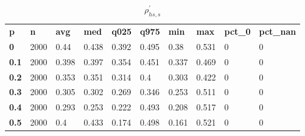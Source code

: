 \begin{table}[h]
 \centering 
\footnotesize
\caption{$\rho_{hs,s}^\prime $}
\label{tab:alphahss}
\begin{tabular}[h]{| l l l l l l l l l l|
    } \hline
\textbf{ p} & \textbf{ n} & \textbf{ avg} & \textbf{ med} & \textbf{ q025} & \textbf{ q975} & \textbf{ min} & \textbf{ max} & \textbf{ pct\_0} & \textbf{ pct\_nan}
           \\
  \textbf{  0} & 2000 &  0.44 & 0.438 & 0.392 & 0.495 &  0.38 & 0.531 & 0 & 0
           \\
  \textbf{0.1} & 2000 & 0.398 & 0.397 & 0.354 & 0.451 & 0.337 & 0.469 & 0 & 0
           \\
  \textbf{0.2} & 2000 & 0.353 & 0.351 & 0.314 &   0.4 & 0.303 & 0.422 & 0 & 0
           \\
  \textbf{0.3} & 2000 & 0.305 & 0.302 & 0.269 & 0.346 & 0.253 & 0.511 & 0 & 0
           \\
  \textbf{0.4} & 2000 & 0.293 & 0.253 & 0.222 & 0.493 & 0.208 & 0.517 & 0 & 0
           \\
  \textbf{0.5} & 2000 &   0.4 & 0.433 & 0.174 & 0.498 & 0.161 & 0.521 & 0 & 0
           \\
 \hline \end{tabular}
 \end{table}
